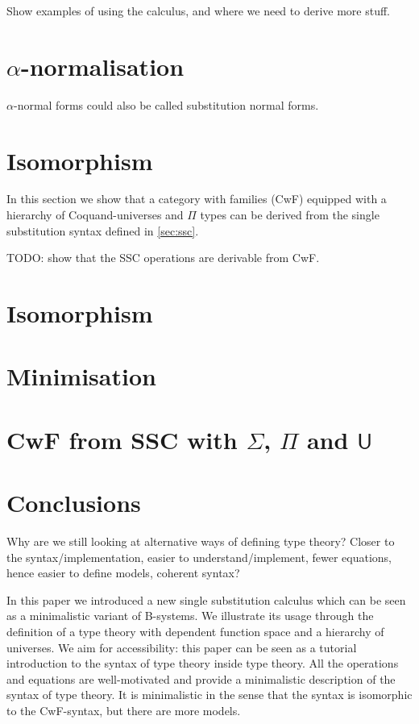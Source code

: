 \documentclass[sigplan,10pt,anonymous,review]{acmart}\settopmatter{printfolios=true,printccs=false,printacmref=false}
\newcommand{\U}{\mathsf{U}}
\begin{document}
Show examples of using the calculus, and where we need to derive more
stuff.

\section{$\alpha$-normalisation}
\label{sec:alpha}

$\alpha$-normal forms could also be called substitution normal forms.

\section{Isomorphism}
\label{sec:cwf}

In this section we show that a category with families (CwF) equipped
with a hierarchy of Coquand-universes and $\Pi$ types can be derived
from the single substitution syntax defined in \autoref{sec:ssc}.

TODO: show that the SSC operations are derivable from CwF.

\section{Isomorphism}
\label{sec:iso}

\section{Minimisation}

\section{CwF from SSC with $\Sigma$, $\Pi$ and $\U$}

\section{Conclusions}
\label{sec:conclusion}

Why are we still looking at alternative ways of defining type theory?
Closer to the syntax/implementation, easier to understand/implement,
fewer equations, hence easier to define models, coherent syntax?


In this paper we introduced a new single substitution calculus which
can be seen as a minimalistic variant of B-systems. We illustrate its
usage through the definition of a type theory with dependent function
space and a hierarchy of universes. We aim for accessibility: this
paper can be seen as a tutorial introduction to the syntax of type
theory inside type theory. All the operations and equations are
well-motivated and provide a minimalistic description of the syntax of
type theory. It is minimalistic in the sense that the syntax is
isomorphic to the CwF-syntax, but there are more models. 
\end{document}
